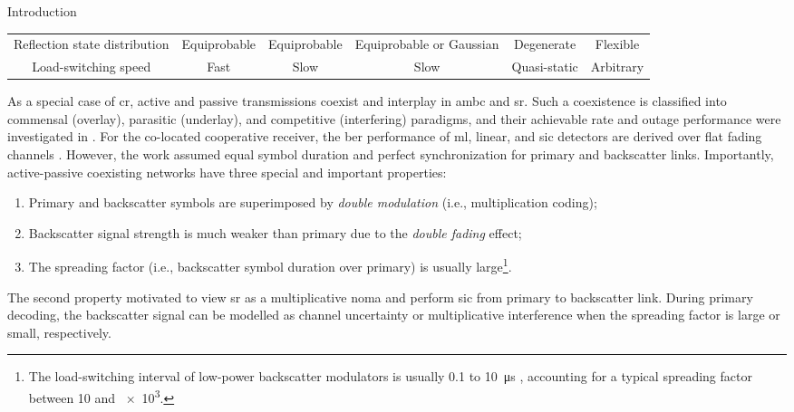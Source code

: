 \documentclass[journal]{IEEEtran}
\begin{document}
\begin{section}{Introduction}
\begin{table*}[!t]
\begin{tabularx}{\textwidth}{CCCCCC}
			Reflection state distribution          & Equiprobable        & Equiprobable                & Equiprobable or Gaussian                        & Degenerate          & Flexible                                                    \\
			Load-switching speed                   & Fast                & Slow                        & Slow                                            & Quasi-static        & Arbitrary                                                   \\ \bottomrule
		\end{tabularx}
	\end{table*}

	As a special case of \gls{cr}, active and passive transmissions coexist and interplay in \gls{ambc} and \gls{sr}.
	Such a coexistence is classified into commensal (overlay), parasitic (underlay), and competitive (interfering) paradigms, and their achievable rate and outage performance were investigated in \cite{Guo2019b,Ding2020}.
	For the co-located cooperative receiver, the \gls{ber} performance of \gls{ml}, linear, and \gls{sic} detectors are derived over flat fading channels \cite{Yang2018}.
	However, the work assumed equal symbol duration and perfect synchronization for primary and backscatter links.
	Importantly, active-passive coexisting networks have three special and important properties:
	\begin{enumerate}
		\item Primary and backscatter symbols are superimposed by \emph{double modulation} (i.e., multiplication coding);
		\item Backscatter signal strength is much weaker than primary due to the \emph{double fading} effect;
		\item The spreading factor (i.e., backscatter symbol duration over primary) is usually large\footnote{The load-switching interval of low-power backscatter modulators is usually \num{0.1} to \SI{10}{\us} \cite{Torres2021}, accounting for a typical spreading factor between \num{10} and \num{e3}.}.
	\end{enumerate}
	The second property motivated \cite{Long2020a,Liang2020,Guo2019b,Ding2020,Zhou2019a,Wu2021a,Xu2021a,Yang2021a,Yang2018,Han2021,Zhang2022} to view \gls{sr} as a multiplicative \gls{noma} and perform \gls{sic} from primary to backscatter link.
	During primary decoding, the backscatter signal can be modelled as channel uncertainty or multiplicative interference when the spreading factor is large or small, respectively.

\end{section}
\end{document}
